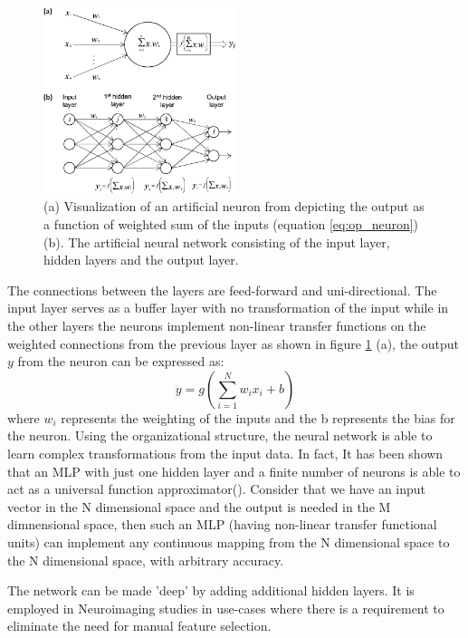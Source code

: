 \documentclass[msthesis.tex]{subfiles}
\begin{document}
\begin{figure}
    \centering
    \includegraphics[width=0.5\textwidth]{images/tnn_ann.png}
    \caption{(a) Visualization of an artificial neuron from \cite{vieira2017using} depicting the output as a function of weighted sum of the inputs (equation \ref{eq:op_neuron}) (b). The artificial neural network consisting of the input layer, hidden layers and the output layer.}
    \label{fig:mlp}
\end{figure}
The connections between the layers are feed-forward and uni-directional. The input layer serves as a buffer layer with no transformation of the input while in the other layers the neurons implement non-linear transfer functions on the weighted connections from the previous layer as shown in figure \ref{fig:mlp} (a), the output $y$ from the neuron can be expressed as:
\begin{equation}
    \label{eq:op_neuron}
    y = g(\sum_{i=1}^{N} w_i x_i +b) 
\end{equation}
where $w_i$ represents the weighting of the inputs and the b represents the bias for the neuron. Using the organizational structure, the neural network is able to learn complex transformations from the input data. In fact, It has been shown that an MLP with just one hidden layer and a finite number of neurons is able to act as a universal function approximator(\cite{universal_mlp}). Consider that we have an input vector in the N dimensional space and the output is needed in the M dimnensional space, then such an MLP (having non-linear transfer functional units) can implement any continuous mapping from the N dimensional space to the N dimensional space, with arbitrary accuracy. 

The network can be made 'deep' by adding additional hidden layers. It is employed in Neuroimaging studies in use-cases where there is a requirement to eliminate the need for manual feature selection.
\end{document}
